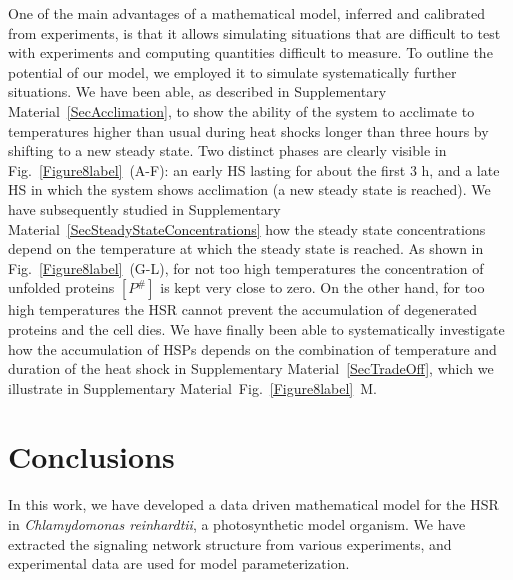 \documentclass[oneside, 10pt, a4paper, twocolumn]{article}
\begin{document}
One of the main advantages of a mathematical model, inferred and calibrated from experiments, is that it allows simulating situations that are difficult to test with experiments and computing quantities difficult to measure. To outline the potential of our model, we {employed} it to simulate {systematically} further situations. 
We have been able, as described in {Supplementary Material~\ref{SecAcclimation}}, to show the ability of the system to {acclimate} to temperatures higher than usual during heat shocks longer than three hours by shifting to a new steady state. Two distinct phases are clearly visible in Fig.~\ref{Figure8label}~(A-F): an early HS lasting for about the first $3$ h, and a late HS in which the system shows {acclimation} (a new steady state is reached). 
We have subsequently studied in Supplementary Material~\ref{SecSteadyStateConcentrations} how the steady state concentrations depend on the temperature at which the steady state is reached. As shown in Fig.~\ref{Figure8label}~(G-L), for not too high temperatures the concentration of unfolded proteins $\left[P^\#\right]$ is kept very close to zero. On the other hand, for too high temperatures the HSR cannot prevent the accumulation of degenerated proteins and the cell dies. 
We have finally been able to systematically investigate how the accumulation of HSPs depends on the combination of temperature and duration of the heat shock in Supplementary Material~\ref{SecTradeOff}, {which we illustrate in Supplementary Material~Fig.~\ref{Figure8label}~M.} 






\section{Conclusions}
\label{SectionConclusions}

In this work, we have developed a data driven mathematical model for the HSR in \emph{Chlamydomonas {reinhardtii}}, a photosynthetic model organism. We have extracted the signaling network structure from various experiments, and experimental data are used for model parameterization.
\end{document}
